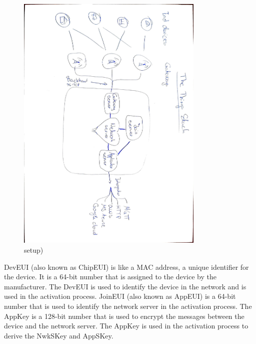 \begin{figure}[H]
    \centering
    \includegraphics[width=0.8\textwidth]{figures/The Things Stack_page-0001.jpg}
    \caption{setup)}
    \label{fig:LoRaWAN_stack}
\end{figure}
















\ac{DevEUI} (also known as ChipEUI) is like a \ac{MAC} address, a unique identifier for the device. It is a 64-bit number that is assigned to the device by the manufacturer. The \ac{DevEUI} is used to identify the device in the network and is used in the activation process. \ac{JoinEUI} (also known as AppEUI) is a 64-bit number that is used to identify the network server in the activation process. The AppKey is a 128-bit number that is used to encrypt the messages between the device and the network server. The AppKey is used in the activation process to derive the NwkSKey and AppSKey.



